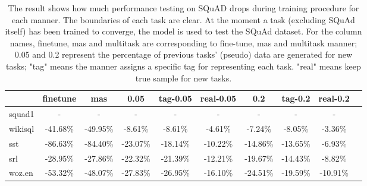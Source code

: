 \begin{table}[]
    \centering
\begin{tabular}{lccccccccc}
\toprule
{} & finetune &     mas &    0.05 & tag-0.05 & real-0.05 &     0.2 & tag-0.2 & real-0.2 \\
\midrule
squad1  &        - &       - &       - &        - &         - &       - &       - &        - \\
wikisql &  -41.68\% & -49.95\% &  -8.61\% &   -8.61\% &    -4.61\% &  -7.24\% &  -8.05\% &   -3.36\% \\
sst     &  -86.63\% & -84.40\% & -23.07\% &  -18.14\% &   -10.22\% & -14.86\% & -13.65\% &   -6.93\% \\
srl     &  -28.95\% & -27.86\% & -22.32\% &  -21.39\% &   -12.21\% & -19.67\% & -14.43\% &   -8.82\% \\
woz.en  &  -53.32\% & -48.07\% & -27.83\% &  -26.95\% &   -16.10\% & -24.51\% & -19.59\% &  -10.91\% \\
\bottomrule
    \end{tabular}
    \caption{The result shows how much performance testing on SQuAD drops during training procedure for each manner. The boundaries of each task are clear. At the moment a task (excluding SQuAd itself) has been trained to converge, the model is used to test the SQuAd dataset. For the column names, finetune, mas and multitask are corresponding to fine-tune, mas and multitask manner; 0.05 and 0.2 represent the percentage of previous tasks' (pseudo) data are generated for new tasks; "tag" means the manner assigns a specific tag for representing each task. "real" means keep true sample for new tasks.}
    \label{tab:bound-squad-forget}
\end{table}
